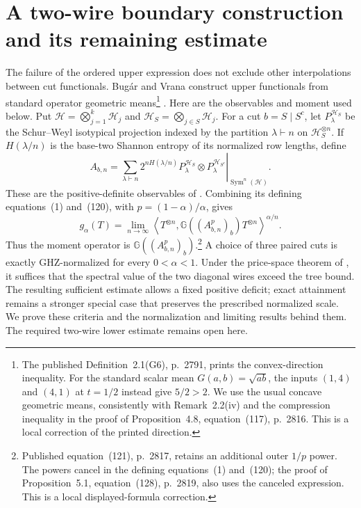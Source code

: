 \section{A two-wire boundary construction and its remaining estimate}
\label{sec:locc-boundary}

The failure of the ordered upper expression does not exclude other
interpolations between cut functionals. Bug\'ar and Vrana construct
upper functionals from standard operator geometric means\footnote{The
published Definition~2.1(G6), p.~2791, prints the convex-direction
inequality. For the standard scalar mean $G(a,b)=\sqrt{ab}$, the inputs
$(1,4)$ and $(4,1)$ at $t=1/2$ instead give $5/2>2$.
We use the usual concave geometric means, consistently with
Remark~2.2(iv) and the compression inequality in the proof of
Proposition~4.8, equation~(117), p.~2816. This is a local correction
of the printed direction.}
\cite[Theorem~4.5, Proposition~4.8 and Example~4.10]{BugarVrana2025}.
Here are the observables and moment used below. Put
\(\mathcal H=\bigotimes_{j=1}^k\mathcal H_j\) and
\(\mathcal H_S=\bigotimes_{j\in S}\mathcal H_j\).
For a cut \(b=S\mid S^c\), let \(P_\lambda^{\mathcal H_S}\) be
the Schur--Weyl isotypical projection indexed by the partition
\(\lambda\vdash n\) on \(\mathcal H_S^{\otimes n}\). If
\(H(\lambda/n)\) is the base-two Shannon entropy of its normalized
row lengths, define
\[
A_{b,n}=
\left.
\sum_{\lambda\vdash n}2^{nH(\lambda/n)}
P_\lambda^{\mathcal H_S}\otimes P_\lambda^{\mathcal H_{S^c}}
\right|_{\operatorname{Sym}^n(\mathcal H)}.
\]
These are the positive-definite observables of
\cite[equation~(118), p.~2817]{BugarVrana2025}.
Combining its defining equations~(1) and~(120), with
\(p=(1-\alpha)/\alpha\), gives
\[
g_\alpha(T)=
\lim_{n\to\infty}
\left\langle T^{\otimes n},
\mathbb G((A_{b,n}^p)_b)T^{\otimes n}
\right\rangle^{\alpha/n}.
\]
Thus the moment operator is
\(\mathbb G((A_{b,n}^p)_b)\).\footnote{Published equation~(121), p.~2817,
retains an additional outer \(1/p\) power. The powers cancel in the
defining equations~(1) and~(120); the proof of Proposition~5.1,
equation~(128), p.~2819, also uses the canceled expression.
This is a local displayed-formula correction.}
A choice of three paired cuts is exactly GHZ-normalized for every
\(0<\alpha<1\). Under the price-space theorem of
\cite[Proposition~C.3, p.~28]{Anthropic2026}, it suffices that the
spectral value of the two diagonal wires exceed the tree bound.
The resulting sufficient estimate allows a fixed positive deficit;
exact attainment remains a stronger special case that preserves
the prescribed normalized scale. We prove these criteria and the
normalization and limiting results behind them.
The required two-wire lower estimate remains open here.

